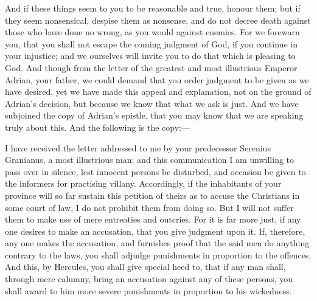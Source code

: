 
And if these things seem to you to be reasonable and true, honour them; but if they seem nonsensical, despise them as nonsense, and do not decree death against those who have done no wrong, as you would against enemies. For we forewarn you, that you shall not escape the coming judgment of God, if you continue in your injustice; and we ourselves will invite you to do that which is pleasing to God. And though from the letter of the greatest and most illustrious Emperor Adrian, your father, we could demand that you order judgment to be given as we have desired, yet we have made this appeal and explanation, not on the ground of Adrian’s decision, but because we know that what we ask is just. And we have subjoined the copy of Adrian’s epistle, that you may know that we are speaking truly about this. And the following is the copy:—


I have received the letter addressed to me by your predecessor Serenius Granianus, a most illustrious man; and this communication I am unwilling to pass over in silence, lest innocent persons be disturbed, and occasion be given to the informers for practising villany. Accordingly, if the inhabitants of your province will so far sustain this petition of theirs as to accuse the Christians in some court of law, I do not prohibit them from doing so. But I will not suffer them to make use of mere entreaties and outcries. For it is far more just, if any one desires to make an accusation, that you give judgment upon it. If, therefore, any one makes the accusation, and furnishes proof that the said men do anything contrary to the laws, you shall adjudge punishments in proportion to the offences. And this, by Hercules, you shall give special heed to, that if any man shall, through mere calumny, bring an accusation against any of these persons, you shall award to him more severe punishments in proportion to his wickedness.


